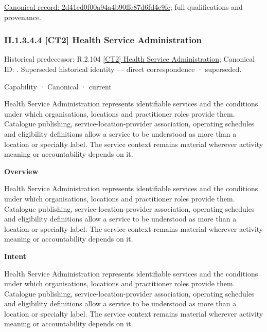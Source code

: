 {\footnotesize \href{../../../../continuum/strategy/capability/2d41ed0f00a94a4b90ffe87d6fd4e9fe.md}{Canonical record: 2d41ed0f00a94a4b90ffe87d6fd4e9fe}; full qualifications and provenance.}\par
\subsubsection*{II.1.3.4.4 [CT2] Health Service Administration}
\label{navigation:II.1.3.4.4}

{\small Historical predecessor: R.2.104 \hyperref[element:f1ab1258cf2944efb50105e7885f8027]{[CT2] Health Service Administration}; Canonical ID: \texttt{}. Superseded historical identity — direct correspondence · superseded.}\par
\label{element:ba68a52913a0499d8377553bddfa74a4}
{\small Capability · Canonical · current}\par

Health Service Administration represents identifiable services and the conditions under which organisations, locations and practitioner roles provide them. Catalogue publishing, service-location-provider association, operating schedules and eligibility definitions allow a service to be understood as more than a location or specialty label. The service context remains material wherever activity meaning or accountability depends on it.



\textbf{Overview}



Health Service Administration represents identifiable services and the conditions under which organisations, locations and practitioner roles provide them. Catalogue publishing, service-location-provider association, operating schedules and eligibility definitions allow a service to be understood as more than a location or specialty label. The service context remains material wherever activity meaning or accountability depends on it.



\textbf{Intent}



Health Service Administration represents identifiable services and the conditions under which organisations, locations and practitioner roles provide them. Catalogue publishing, service-location-provider association, operating schedules and eligibility definitions allow a service to be understood as more than a location or specialty label. The service context remains material wherever activity meaning or accountability depends on it.



